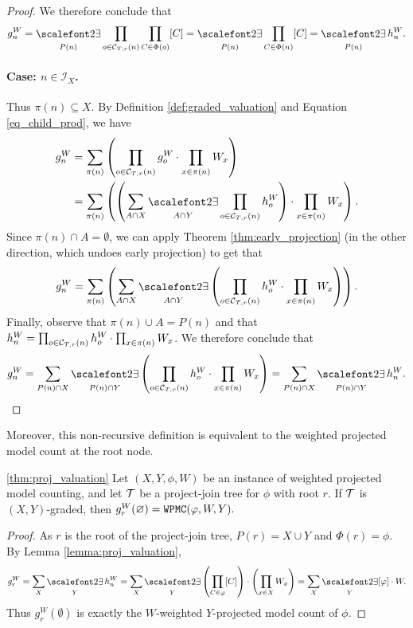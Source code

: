 \begin{proof}
We therefore conclude that $$g^W_n = \displaystyle\exist_{P(n)} \prod_{o \in \C{T}{r}{n}} \prod_{C \in \Phi(o)} [C] = \displaystyle\exist_{P(n)} \prod_{C \in \Phi(n)} [C] = \displaystyle\exist_{P(n)} h^W_n.$$

\paragraph{Case: $n \in \mathcal{I}_X$.} Thus $\pi(n) \subseteq X$. 
By Definition \ref{def:graded_valuation} and Equation \eqref{eq_child_prod}, we have
\begin{align*}
    g^W_n 
    &= \displaystyle\sum_{\pi(n)} \pars{ \prod_{o \in \C T r n} g^W_o \cdot \prod_{x \in \pi(n)} W_x }\\ 
    &= \sum_{\pi(n)} \pars{ \pars{ \sum_{A \cap X} \displaystyle\exist_{A \cap Y} \prod_{o \in \C{T}{r}{n}} h^W_o } \cdot \prod_{x \in \pi(n)} W_x }.
\end{align*}
Since $\pi(n) \cap A = \emptyset$, we can apply Theorem \ref{thm:early_projection} (in the other direction, which undoes early projection) to get that
\begin{equation*}
    g^W_n = \sum_{\pi(n)} \pars{ \sum_{A \cap X} \displaystyle\exist_{A \cap Y} \left( \prod_{o \in \C{T}{r}{n}} h^W_o \cdot \prod_{x \in \pi(n)} W_x \right) }.
\end{equation*}
Finally, observe that $\pi(n) \cup A = P(n)$ and that $h^W_n = \prod_{o \in \mathcal{C}_{T,r}(n)} h^W_o \cdot \prod_{x \in \pi(n)} W_x$. We therefore conclude that
\begin{equation*}
    g^W_n = \sum_{P(n) \cap X} \displaystyle\exist_{P(n) \cap Y} \left( \prod_{o \in \C{T}{r}{n}} h^W_o \cdot \prod_{x \in \pi(n)} W_x \right) =  \sum_{P(n) \cap X} \displaystyle\exist_{P(n) \cap Y} h^W_n.
\end{equation*}
\end{proof}

Moreover, this non-recursive definition is equivalent to the weighted projected model count at the root node.
\begin{theorem}{\ref{thm:proj_valuation}}
Let $(X, Y, \phi, W)$ be an instance of weighted projected model counting, and let $\mathcal{T}$ be a project-join tree for $\phi$ with root $r$. 
If $\mathcal{T}$ is $(X, Y)$-graded, then $g^W_r(\varnothing) = \texttt{\upshape WPMC}(\varphi, W, Y).$
\end{theorem}
\begin{proof}
As $r$ is the root of the project-join tree, $P(r) = X \cup Y$ and $\Phi(r) = \phi$. By Lemma \ref{lemma:proj_valuation}, $$g^W_r = \sum_{X} \displaystyle\exist_{Y} h^W_n = \sum_{X} \displaystyle\exist_{Y} \left( \prod_{C \in \phi} [C] \right) \mult \left( \prod_{x \in X} W_x \right) = \sum_{X} \displaystyle\exist_{Y} [\phi] \mult W.$$
Thus $g^W_r(\emptyset)$ is exactly the $W$-weighted $Y$-projected model count of $\phi$.
\end{proof}



